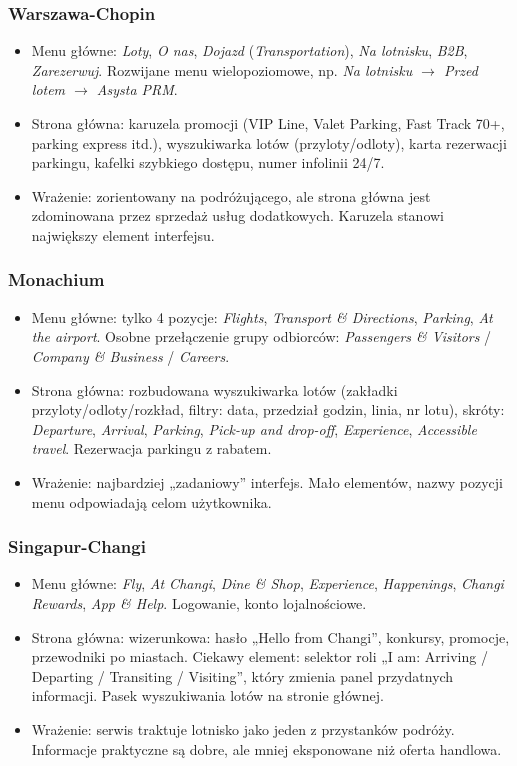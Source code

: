 \documentclass[11pt,a4paper]{article}
\begin{document}
\subsubsection*{Warszawa-Chopin}
\begin{itemize}[leftmargin=*]
  \item Menu główne: \textit{Loty}, \textit{O nas}, \textit{Dojazd} (\textit{Transportation}), \textit{Na lotnisku}, \textit{B2B}, \textit{Zarezerwuj}. Rozwijane menu wielopoziomowe, np. \textit{Na lotnisku $\rightarrow$ Przed lotem $\rightarrow$ Asysta PRM}.
  \item Strona główna: karuzela promocji (VIP Line, Valet Parking, Fast Track 70+, parking express itd.), wyszukiwarka lotów (przyloty/odloty), karta rezerwacji parkingu, kafelki szybkiego dostępu, numer infolinii 24/7.
  \item Wrażenie: zorientowany na podróżującego, ale strona główna jest zdominowana przez sprzedaż usług dodatkowych. Karuzela stanowi największy element interfejsu.
\end{itemize}

\subsubsection*{Monachium}
\begin{itemize}[leftmargin=*]
  \item Menu główne: tylko 4 pozycje: \textit{Flights}, \textit{Transport \& Directions}, \textit{Parking}, \textit{At the airport}. Osobne przełączenie grupy odbiorców: \textit{Passengers \& Visitors} / \textit{Company \& Business} / \textit{Careers}.
  \item Strona główna: rozbudowana wyszukiwarka lotów (zakładki przyloty/odloty/rozkład, filtry: data, przedział godzin, linia, nr lotu), skróty: \textit{Departure}, \textit{Arrival}, \textit{Parking}, \textit{Pick-up and drop-off}, \textit{Experience}, \textit{Accessible travel}. Rezerwacja parkingu z rabatem.
  \item Wrażenie: najbardziej „zadaniowy” interfejs. Mało elementów, nazwy pozycji menu odpowiadają celom użytkownika.
\end{itemize}

\subsubsection*{Singapur-Changi}
\begin{itemize}[leftmargin=*]
  \item Menu główne: \textit{Fly}, \textit{At Changi}, \textit{Dine \& Shop}, \textit{Experience}, \textit{Happenings}, \textit{Changi Rewards}, \textit{App \& Help}. Logowanie, konto lojalnościowe.
  \item Strona główna: wizerunkowa: hasło „Hello from Changi”, konkursy, promocje, przewodniki po miastach. Ciekawy element: selektor roli „I am: Arriving / Departing / Transiting / Visiting”, który zmienia panel przydatnych informacji. Pasek wyszukiwania lotów na stronie głównej.
  \item Wrażenie: serwis traktuje lotnisko jako jeden z przystanków podróży. Informacje praktyczne są dobre, ale mniej eksponowane niż oferta handlowa.
\end{itemize}
\end{document}
